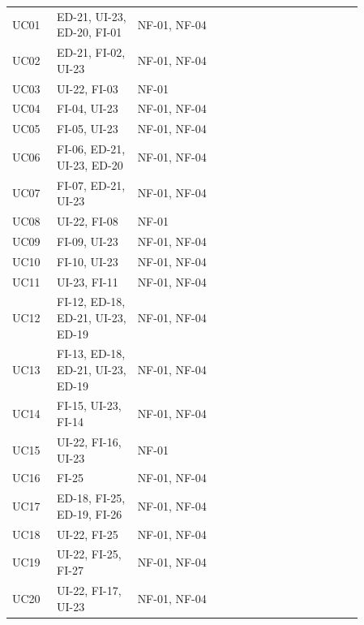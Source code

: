 \documentclass[a4paper,11pt]{article}
\begin{document}
{\begin{longtable}{@{}H{0.10\linewidth} P{0.20\linewidth} P{0.20\linewidth} P{0.12\linewidth} P{0.12\linewidth} P{0.12\linewidth}@{}}
\mbox{UC01} & \mbox{ED-21}, \mbox{UI-23}, \mbox{ED-20}, \mbox{FI-01} & \mbox{NF-01}, \mbox{NF-04} & & & \\
\mbox{UC02} & \mbox{ED-21}, \mbox{FI-02}, \mbox{UI-23} & \mbox{NF-01}, \mbox{NF-04} & & & \\
\mbox{UC03} & \mbox{UI-22}, \mbox{FI-03} & \mbox{NF-01} & & & \\
\mbox{UC04} & \mbox{FI-04}, \mbox{UI-23} & \mbox{NF-01}, \mbox{NF-04} & & & \\
\mbox{UC05} & \mbox{FI-05}, \mbox{UI-23} & \mbox{NF-01}, \mbox{NF-04} & & & \\
\mbox{UC06} & \mbox{FI-06}, \mbox{ED-21}, \mbox{UI-23}, \mbox{ED-20} & \mbox{NF-01}, \mbox{NF-04} & & & \\
\mbox{UC07} & \mbox{FI-07}, \mbox{ED-21}, \mbox{UI-23} & \mbox{NF-01}, \mbox{NF-04} & & & \\
\mbox{UC08} & \mbox{UI-22}, \mbox{FI-08} & \mbox{NF-01} & & & \\
\mbox{UC09} & \mbox{FI-09}, \mbox{UI-23} & \mbox{NF-01}, \mbox{NF-04} & & & \\
\mbox{UC10} & \mbox{FI-10}, \mbox{UI-23} & \mbox{NF-01}, \mbox{NF-04} & & & \\
\mbox{UC11} & \mbox{UI-23}, \mbox{FI-11} & \mbox{NF-01}, \mbox{NF-04} & & & \\
\mbox{UC12} & \mbox{FI-12}, \mbox{ED-18}, \mbox{ED-21}, \mbox{UI-23}, \mbox{ED-19} & \mbox{NF-01}, \mbox{NF-04} & & & \\
\mbox{UC13} & \mbox{FI-13}, \mbox{ED-18}, \mbox{ED-21}, \mbox{UI-23}, \mbox{ED-19} & \mbox{NF-01}, \mbox{NF-04} & & & \\
\mbox{UC14} & \mbox{FI-15}, \mbox{UI-23}, \mbox{FI-14} & \mbox{NF-01}, \mbox{NF-04} & & & \\
\mbox{UC15} & \mbox{UI-22}, \mbox{FI-16}, \mbox{UI-23} & \mbox{NF-01} & & & \\
\mbox{UC16} & \mbox{FI-25} & \mbox{NF-01}, \mbox{NF-04} & & & \\
\mbox{UC17} & \mbox{ED-18}, \mbox{FI-25}, \mbox{ED-19}, \mbox{FI-26} & \mbox{NF-01}, \mbox{NF-04} & & & \\
\mbox{UC18} & \mbox{UI-22}, \mbox{FI-25} & \mbox{NF-01}, \mbox{NF-04} & & & \\
\mbox{UC19} & \mbox{UI-22}, \mbox{FI-25}, \mbox{FI-27} & \mbox{NF-01}, \mbox{NF-04} & & & \\
\mbox{UC20} & \mbox{UI-22}, \mbox{FI-17}, \mbox{UI-23} & \mbox{NF-01}, \mbox{NF-04} & & & \\
\end{longtable}
}
\end{document}
